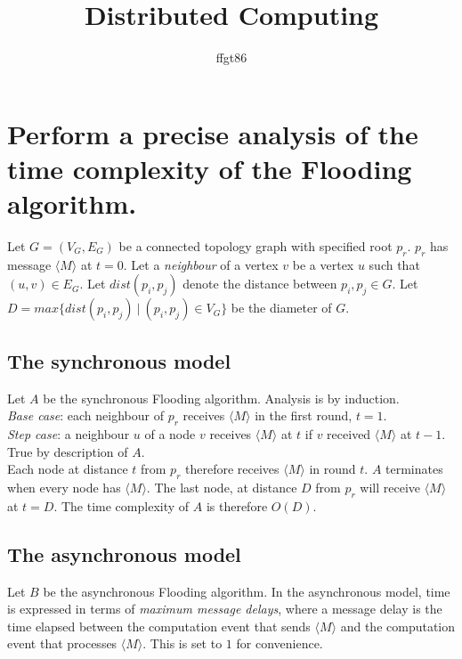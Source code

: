 \documentclass[11pt]{article} %
\title{Distributed Computing}
\author{ffgt86}
\begin{document}
\maketitle

\section{Perform a precise analysis of the time complexity of the Flooding algorithm.}

Let $G = (V_G, E_G)$ be a connected topology graph with specified root $p_r$.  $p_r$ has message $\langle M \rangle$ at $t = 0$.  Let a \textit{neighbour} of a vertex $v$ be a vertex $u$ such that $(u, v) \in E_G$. 
Let $dist(p_i, p_j)$ denote the distance between $p_i, p_j \in G$. Let $D = max\{dist(p_i, p_j) \ | \ (p_i, p_j) \in V_G \}$ be the diameter of $G$. 

\subsection{The synchronous model}

Let $A$ be the synchronous Flooding algorithm. Analysis is by induction.\\

\noindent
\textit{Base case}: each neighbour of $p_r$ receives $\langle M \rangle$ in the first round, $t = 1$.\\
\textit{Step case}: a neighbour $u$ of a node $v$ receives $\langle M \rangle$ at $t$ if $v$ received $\langle M \rangle$ at $t - 1$. True by description of $A$. \\

Each node at distance $t$ from $p_r$ therefore receives $\langle M \rangle$ in round $t$. $A$ terminates when every node has $\langle M \rangle$. The last node, at distance $D$ from $p_r$ will receive $\langle M \rangle$ at $t = D$. The time complexity of $A$ is therefore $O(D)$.

\subsection{The asynchronous model}

Let $B$ be the asynchronous Flooding algorithm. In the asynchronous model, time is expressed in terms of \textit{maximum message delays}, where a message delay is the time elapsed between the computation event that sends  $\langle M \rangle$ and the computation event that processes $\langle M \rangle$. This is set to $1$ for convenience. 
\end{document}
